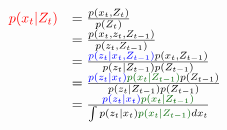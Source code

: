 {%
\begin{equation}
\begin{array}{lllllllll}
{\color{red}p(x_t | Z_t)} &= \frac{p(x_t, Z_t)}{p(Z_t)}\\
&= \frac{p(x_t, z_t, Z_{t-1})}{p(z_t, Z_{t-1})}\\
&= \frac{{\color{blue}p(z_t|x_t,Z_{t-1})}p(x_t, Z_{t-1})}{p(z_t|Z_{t-1})p(Z_{t-1})}\\
&= \frac{{\color{blue}p(z_t|x_t)}{\color{darkgreen}p(x_t|Z_{t-1})}p(Z_{t-1})}{p(z_t|Z_{t-1})p(Z_{t-1})}\\
&= \frac{{\color{blue}p(z_t|x_t)}{\color{darkgreen}p(x_t|Z_{t-1})}}{\int{p(z_t|x_t){\color{darkgreen}p(x_t |Z_{t-1})}}dx_t}
\end{array}
\label{Eqn:TRK_update}
\end{equation}
}





